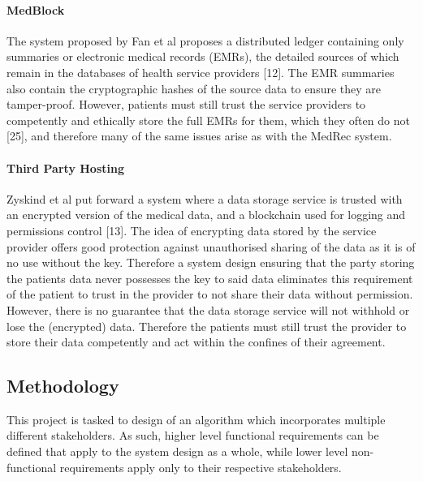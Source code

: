 \documentclass[]{article}
\let\oldparagraph\paragraph
\renewcommand{\paragraph}[1]{\oldparagraph{#1}\mbox{}}
\begin{document}
\hypertarget{header-n32}{%
\paragraph{MedBlock}\label{header-n32}}

The system proposed by Fan et al proposes a distributed ledger
containing only summaries or electronic medical records (EMRs), the
detailed sources of which remain in the databases of health service
providers {[}12{]}. The EMR summaries also contain the cryptographic
hashes of the source data to ensure they are tamper-proof. However,
patients must still trust the service providers to competently and
ethically store the full EMRs for them, which they often do not
{[}25{]}, and therefore many of the same issues arise as with the MedRec
system.

\hypertarget{header-n34}{%
\paragraph{Third Party Hosting}\label{header-n34}}

Zyskind et al put forward a system where a data storage service is
trusted with an encrypted version of the medical data, and a blockchain
used for logging and permissions control {[}13{]}. The idea of
encrypting data stored by the service provider offers good protection
against unauthorised sharing of the data as it is of no use without the
key. Therefore a system design ensuring that the party storing the
patients data never possesses the key to said data eliminates this
requirement of the patient to trust in the provider to not share their
data without permission. However, there is no guarantee that the data
storage service will not withhold or lose the (encrypted) data.
Therefore the patients must still trust the provider to store their data
competently and act within the confines of their agreement.

\hypertarget{header-n36}{%
\subsection{Methodology}\label{header-n36}}

This project is tasked to design of an algorithm which incorporates
multiple different stakeholders. As such, higher level functional
requirements can be defined that apply to the system design as a whole,
while lower level non-functional requirements apply only to their
respective stakeholders.
\end{document}
